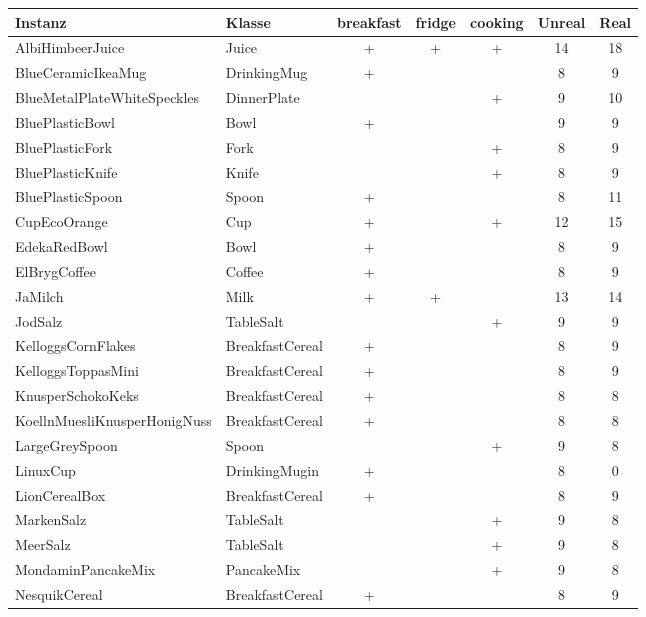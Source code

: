 \begin{table}
\begin{tabularx}{\textwidth}{llccccc}
\textbf{Instanz}  				& \textbf{Klasse}	& \textbf{breakfast}	& \textbf{fridge}	& \textbf{cooking}	& \textbf{Unreal} & \textbf{Real} \\ \hline
AlbiHimbeerJuice				& Juice				& +			& +			& +			& 14	& 18	\\
BlueCeramicIkeaMug				& DrinkingMug		& +			& 			&			& 8		& 9\\
BlueMetalPlateWhiteSpeckles		& DinnerPlate		& 			& 			&	+		& 9		& 10\\
BluePlasticBowl					& Bowl				& +			& 			&			& 9		& 9\\
BluePlasticFork					& Fork				& 			& 			&	+		& 8		& 9\\
BluePlasticKnife				& Knife				& 			& 			&	+		& 8		& 9\\
BluePlasticSpoon				& Spoon				& +			& 			&			& 8		& 11\\
CupEcoOrange					& Cup				& +			& 			&	+		& 12	& 15\\
EdekaRedBowl					& Bowl				& +			& 			&			& 8		& 9\\
ElBrygCoffee					& Coffee			& +			& 			&			& 8		& 9\\
JaMilch							& Milk				& +			& +			&			& 13	& 14\\
JodSalz							& TableSalt			& 			& 			&	+		& 9		& 9\\
KelloggsCornFlakes				& BreakfastCereal	& +			& 			&			& 8		& 9\\
KelloggsToppasMini				& BreakfastCereal	& +			& 			&			& 8		& 9\\
KnusperSchokoKeks				& BreakfastCereal	& +			& 			&			& 8		& 8\\
KoellnMuesliKnusperHonigNuss	& BreakfastCereal	& +			& 			&			& 8		& 8	\\
LargeGreySpoon					& Spoon				& 			& 			&	+		& 9		& 8	\\
LinuxCup						& DrinkingMugin		& +			& 			&			& 8		& 0\\
LionCerealBox					& BreakfastCereal	& +			& 			&			& 8		& 9	\\
MarkenSalz						& TableSalt			& 			& 			&	+		& 9		& 8	\\
MeerSalz						& TableSalt			& 			& 			&	+		& 9		& 8	\\
MondaminPancakeMix				& PancakeMix		& 			& 			&	+		& 9		& 8	\\
NesquikCereal					& BreakfastCereal	& +			& 			&			& 8		& 9	\\

\end{tabularx}
\end{table}
